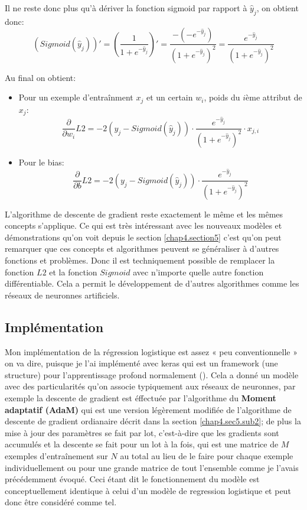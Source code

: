 Il ne reste donc plus qu'à dériver la fonction sigmoid par rapport à \(\hat{y}_j\), on obtient donc: \[(Sigmoid(\hat{y}_j))' = (\frac{1}{1 + e^{-\hat{y}_j}})' = \frac{-(-e^{-\hat{y}_j})}{(1 + e^{-\hat{y}_j})^2} = \frac{e^{-\hat{y}_j}}{(1 + e^{-\hat{y}_j})^2}\]

Au final on obtient:

\begin{itemize}
    \item Pour un exemple d’entraînment \(x_j\) et un certain \(w_i\), poids du \(i\)ème attribut de \(x_j\): \[\frac{\partial}{\partial w_i} L2 = -2(y_j - Sigmoid(\hat{y}_j)) \cdot \frac{e^{-\hat{y}_j}}{(1 + e^{-\hat{y}_j})^2} \cdot x_{j,i}\]
    \item Pour le bias: \[\frac{\partial}{\partial b} L2 = -2(y_j - Sigmoid(\hat{y}_j)) \cdot \frac{e^{-\hat{y}_j}}{(1 + e^{-\hat{y}_j})^2}\]
\end{itemize}

L'algorithme de descente de gradient reste exactement le même et les mêmes concepts s'applique. Ce qui est très intéressant avec les nouveaux modèles et démonstrations qu'on voit depuis le section \ref{chap4.section5} c'est qu'on peut remarquer que ces concepts et algorithmes peuvent se généraliser à d'autres fonctions et problèmes. Donc il est techniquement possible de remplacer la fonction \(L2\) et la fonction \(Sigmoid\) avec n'importe quelle autre fonction différentiable. Cela a permit le développement de d'autres algorithmes comme les réseaux de neuronnes artificiels.

\subsection{Implémentation}
\label{chap4.sec6.sub2}
Mon implémentation de la régression logistique est assez « peu conventionnelle » on va dire, puisque je l'ai implémenté avec keras qui est un framework (une structure) pour l'apprentissage profond normalement (\cite{chollet2015keras}). Cela a donné un modèle avec des particularités qu'on associe typiquement aux réseaux de neuronnes, par exemple la descente de gradient est éffectuée par l'algorithme du \textbf{Moment adaptatif (AdaM)} qui est une version légèrement modifiée de l'algorithme de descente de gradient ordianaire décrit dans la section \ref{chap4.sec5.sub2}; de plus la mise à jour des paramètres se fait par lot, c'est-à-dire que les gradients sont accumulés et la descente se fait pour un lot à la fois, qui est une matrice de \(M\) exemples d'entraînement sur \(N\) au total au lieu de le faire pour chaque exemple individuellement ou pour une grande matrice de tout l'ensemble comme je l'avais précédemment évoqué. Ceci étant dit le fonctionnement du modèle est conceptuellement identique à celui d'un modèle de regression logistique et peut donc être considéré comme tel.

